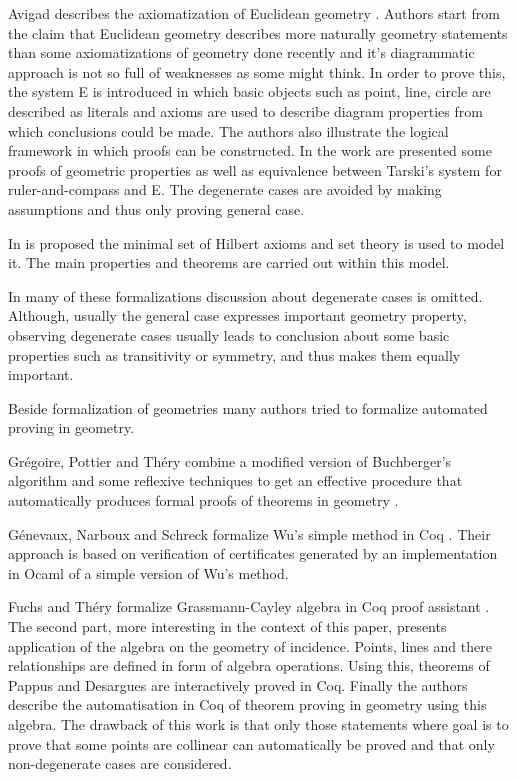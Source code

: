 Avigad describes the axiomatization of Euclidean geometry
\cite{avigad}. Authors start from the claim that Euclidean geometry
describes more naturally geometry statements than some axiomatizations
of geometry done recently and it's diagrammatic approach is not so
full of weaknesses as some might think. In order to prove this, the
system E is introduced in which basic objects such as point, line,
circle are described as literals and axioms are used to describe
diagram properties from which conclusions could be made. The authors
also illustrate the logical framework in which proofs can be
constructed. In the work are presented some proofs of geometric
properties as well as equivalence between Tarski's system for
ruler-and-compass and E. The degenerate cases are avoided by making
assumptions and thus only proving general case.

In \cite{william} is proposed the minimal set of Hilbert axioms and
set theory is used to model it. The main properties and theorems are
carried out within this model.

In many of these formalizations discussion about degenerate cases is
omitted. Although, usually the general case expresses important
geometry property, observing degenerate cases usually leads to
conclusion about some basic properties such as transitivity or
symmetry, and thus makes them equally important.

Beside formalization of geometries many authors tried to formalize
automated proving in geometry.

Gr\'egoire, Pottier and Th\'ery combine a modified version of
Buchberger’s algorithm and some reflexive techniques to get an
effective procedure that automatically produces formal proofs of
theorems in geometry \cite{grobnercoq}.

G\'enevaux, Narboux and Schreck formalize Wu's simple method in Coq
\cite{wucoq}. Their approach is based on verification of certificates
generated by an implementation in Ocaml of a simple version of Wu's
method.

Fuchs and Th{\'e}ry formalize Grassmann-Cayley algebra in Coq proof
assistant \cite{grassman}. The second part, more interesting in the
context of this paper, presents application of the algebra on the
geometry of incidence. Points, lines and there relationships are
defined in form of algebra operations. Using this, theorems of Pappus
and Desargues are interactively proved in Coq. Finally the authors
describe the automatisation in Coq of theorem proving in geometry
using this algebra. The drawback of this work is that only those
statements where goal is to prove that some points are collinear can
automatically be proved and that only non-degenerate cases are
considered.

